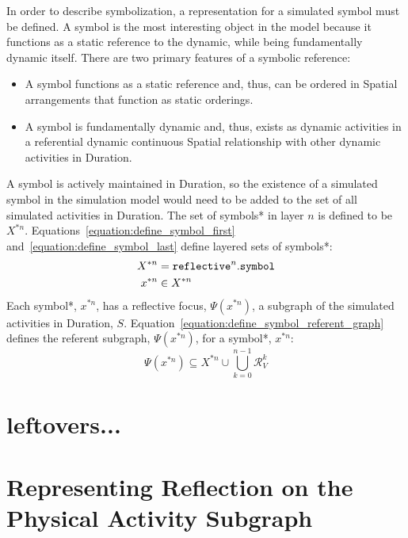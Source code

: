 In order to describe symbolization, a representation for a simulated
symbol must be defined.  A symbol is the most interesting object in
the model because it functions as a static reference to the dynamic,
while being fundamentally dynamic itself.  There are two primary
features of a symbolic reference:
\begin{itemize}
\item A symbol functions as a static reference and, thus, can be
  ordered in Spatial arrangements that function as static orderings.
\item A symbol is fundamentally dynamic and, thus, exists as dynamic
  activities in a referential dynamic continuous Spatial relationship
  with other dynamic activities in Duration.
\end{itemize}
A symbol is actively maintained in Duration, so the existence of a
simulated symbol in the simulation model would need to be added to the
set of all simulated activities in Duration.  The set of symbols* in
layer $n$ is defined to be $X^{*n}$.
{\mbox{Equations~\ref{equation:define_symbol_first}}}
{\mbox{and~\ref{equation:define_symbol_last}}} define layered sets of
symbols*:
\begin{align}
\label{equation:define_symbol_first}
           X^{*n} &= \text{\tt{reflective}}^n.\text{\tt{symbol}} \\
\label{equation:define_symbol_last}
           x^{*n} &\in X^{*n}
\end{align}
Each symbol*, $x^{*n}$, has a reflective focus, $\Psi(x^{*n})$, a
subgraph of the simulated activities in Duration, $S$.
{\mbox{Equation~\ref{equation:define_symbol_referent_graph}}} defines
the referent subgraph, $\Psi(x^{*n})$, for a symbol*, $x^{*n}$:
\begin{equation}
\label{equation:define_symbol_referent_graph}
  \Psi(x^{*n}) \subseteq X^{*n} \cup \bigcup_{k=0}^{n-1}\mathcal{R}^k_V
\end{equation}



\section{leftovers...}

\section{Representing Reflection on the Physical Activity Subgraph}

